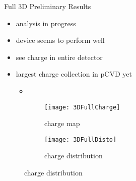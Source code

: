 \begin{frame}{Full 3D Preliminary Results}

	\begin{itemize}
		\itemfill
		\item analysis in progress
		\item device seems to perform well
		\item see charge in entire detector
		\item largest charge collection in pCVD yet
		\begin{itemize}
			\vspace*{1pt}
			\item {}
		\end{itemize}
	\end{itemize}
	
	\vspace*{-5pt}
	\begin{figure}
		\centering
		\begin{subfigure}{0.45\textwidth}  
			\centering 
			\texttt{[image: 3DFullCharge]}
			\caption{charge map}
		\end{subfigure}
		\begin{subfigure}{0.45\textwidth} 
			\centering 
			\texttt{[image: 3DFullDisto]}
			\caption{charge distribution}
		\end{subfigure}
	\end{figure}\vspace*{-15pt}

\end{frame}

